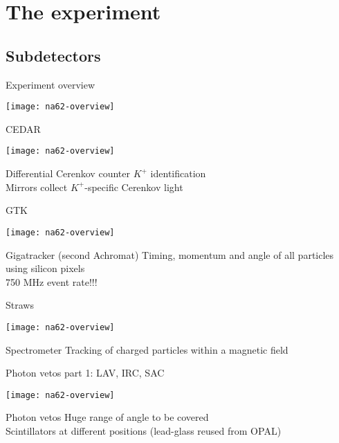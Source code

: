 \section{The experiment}
\subsection{Subdetectors}
\begin{frame}{Experiment overview}{}
	\begin{center} 
		\texttt{[image: na62-overview]}
	\end{center}
\end{frame}

\begin{frame}{CEDAR}{}
	\begin{center} 
		\texttt{[image: na62-overview]}
	\end{center}
	\begin{block}{Differential Cerenkov counter}
		$K^+$ identification \\
		Mirrors collect $K^+$-specific Cerenkov light
	\end{block}
\end{frame}

\begin{frame}{GTK}{}
	\begin{center} 
		\texttt{[image: na62-overview]}
	\end{center}
	\begin{block}{Gigatracker (second Achromat)}
		Timing, momentum and angle of all particles using silicon pixels \\
		750 MHz event rate!!!
	\end{block}
\end{frame}

\begin{frame}{Straws}{}
	\begin{center} 
		\texttt{[image: na62-overview]}
	\end{center}
	\begin{block}{Spectrometer}
		Tracking of charged particles within a magnetic field
	\end{block}
\end{frame}

\begin{frame}{Photon vetos part 1: LAV, IRC, SAC}{}
	\begin{center} 
		\texttt{[image: na62-overview]}
	\end{center}
	\begin{block}{Photon vetos}
		Huge range of angle to be covered \\ 
		Scintillators at different positions (lead-glass reused from OPAL)
	\end{block}
\end{frame}

